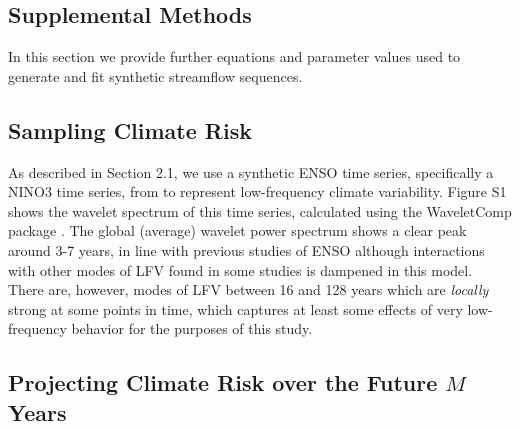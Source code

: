 \documentclass[
      draft,
      ef,
]{agutexSI2019}
\begin{document}
\begin{article}

\renewcommand{\thefigure}{S\arabic{figure}}
\setcounter{figure}{0}
\renewcommand{\theequation}{S\arabic{equation}}
\setcounter{equation}{0}
\renewcommand{\thetable}{S\arabic{table}}
\setcounter{table}{0}

\section{Supplemental Methods}\label{sec:supp-methods}

In this section we provide further equations and parameter values used to generate and fit synthetic streamflow sequences.

\subsection{Sampling Climate Risk}\label{sec:supp-nino-spectrum}

As described in Section 2.1, we use a synthetic ENSO time series, specifically a NINO3 time series, from \cite{Ramesh:2016hf} to represent low-frequency climate variability.
Figure S1 shows the wavelet spectrum of this time series, calculated using the WaveletComp package \cite{Roesch:wlBQQoIs}.
The global (average) wavelet power spectrum shows a clear peak around 3-7 years, in line with previous studies of ENSO although interactions with other modes of LFV found in some studies \cite{Jin:1994wq} is dampened in this model.
There are, however, modes of LFV between 16 and 128 years which are \emph{locally} strong at some points in time, which captures at least some effects of very low-frequency behavior for the purposes of this study.

\subsection{Projecting Climate Risk over the Future $M$ Years}


\end{article}
\end{document}
